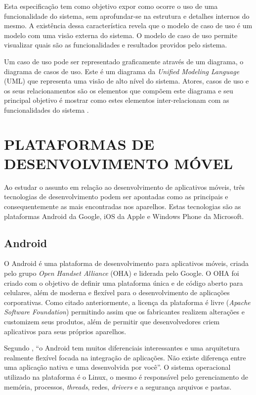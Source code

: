 \documentclass[
	12pt,				%
	openright,			%
	oneside,			%
	a4paper,			%
	chapter=TITLE,		%
	section=TITLE,		%
	english,			%
	french,				%
	spanish,			%
	brazil				%
	]{abntex2}
\begin{document}
Esta especificação tem como objetivo expor como ocorre o uso de uma funcionalidade do sistema, sem aprofundar-se na estrutura e detalhes internos do mesmo. A existência dessa característica revela que o modelo de caso de uso é um modelo com uma visão externa do sistema. O modelo de caso de uso permite visualizar quais são as funcionalidades e resultados providos pelo sistema.

Um caso de uso pode ser representado graficamente através de um diagrama, o diagrama de casos de uso. Este é um diagrama da \textit{Unified Modeling Language} (UML) que representa uma visão de alto nível do sistema. Atores, casos de uso e os seus relacionamentos são os elementos que compõem este diagrama e seu principal objetivo é mostrar como estes elementos inter-relacionam com as funcionalidades do sistema \cite{bezerraUML}. 
 

\section{PLATAFORMAS DE DESENVOLVIMENTO MÓVEL}
Ao estudar o assunto em relação ao desenvolvimento de aplicativos móveis, três tecnologias de desenvolvimento podem ser apontadas como as principais e consequentemente as mais encontradas nos aparelhos. Estas tecnologias são as plataformas Android da Google, iOS da Apple e Windows Phone da Microsoft.

\subsection{Android}
O Android é uma plataforma de desenvolvimento para aplicativos móveis, criada pelo grupo \textit{Open Handset Alliance} (OHA) e liderada pelo Google. O OHA foi criado com o objetivo de definir uma plataforma única e de código aberto para celulares, além de moderna e flexível para o desenvolvimento de aplicações corporativas. Como citado anteriormente, a licença da plataforma é livre (\textit{Apache Software Foundation}) permitindo assim que os fabricantes realizem alterações e customizem seus produtos, além de permitir que desenvolvedores criem aplicativos para seus próprios aparelhos. 

Segundo , “o Android tem muitos diferenciais interessantes e uma arquitetura realmente flexível focada na integração de aplicações. Não existe diferença entre uma aplicação nativa e uma desenvolvida por você”. O sistema operacional utilizado na plataforma é o Linux, o mesmo é responsável pelo gerenciamento de memória, processos, \textit{threads}, redes, \textit{drivers} e a segurança arquivos e pastas. 
\end{document}
